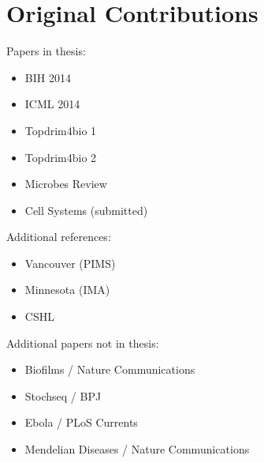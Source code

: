 \section{Original Contributions}

Papers in thesis:

\begin{itemize}
\item BIH 2014
\item ICML 2014
\item Topdrim4bio 1
\item Topdrim4bio 2
\item Microbes Review
\item Cell Systems (submitted)
\end{itemize}

Additional references:

\begin{itemize}
\item Vancouver (PIMS)
\item Minnesota (IMA)
\item CSHL
\end{itemize}

Additional papers not in thesis:

\begin{itemize}
\item Biofilms / Nature Communications
\item Stochseq / BPJ
\item Ebola / PLoS Currents
\item Mendelian Diseases / Nature Communications
\end{itemize}